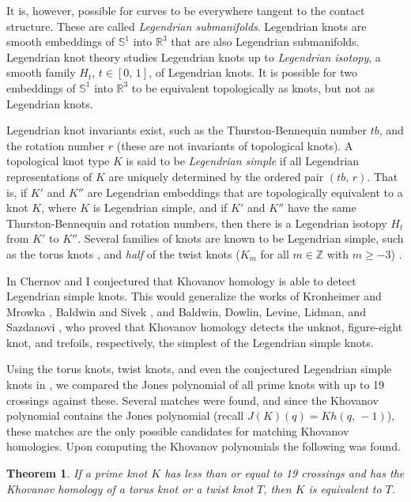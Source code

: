 \documentclass{article}
\theoremstyle{plain}
\newtheorem{theorem}{Theorem}
\begin{document}
        It is, however, possible for curves to be everywhere tangent to the
        contact structure. These are called \textit{Legendrian submanifolds}.
        Legendrian knots are smooth embeddings of $\mathbb{S}^{1}$ into
        $\mathbb{R}^{3}$ that are also Legendrian submanifolds. Legendrian
        knot theory studies Legendrian knots up to \textit{Legendrian isotopy},
        a smooth family $H_{t}$, $t\in[0,\,1]$, of Legendrian knots. It is
        possible for two embeddings of $\mathbb{S}^{1}$ into $\mathbb{R}^{3}$
        to be equivalent topologically as knots, but not as Legendrian knots.
        \par\hfill\par
        Legendrian knot invariants exist, such as the Thurston-Bennequin
        number $tb$, and the rotation number $r$ (these are not invariants of
        topological knots). A topological knot type $K$ is said to be
        \textit{Legendrian simple} if all Legendrian representations of $K$ are
        uniquely determined by the ordered pair $(tb,\,r)$. That is, if
        $K'$ and $K''$ are Legendrian embeddings that are topologically
        equivalent to a knot $K$, where $K$ is Legendrian simple, and if
        $K'$ and $K''$ have the same Thurston-Bennequin and rotation numbers,
        then there is a Legendrian isotopy $H_{t}$ from $K'$ to $K''$.
        Several families of knots are known to be Legendrian simple, such as
        the torus knots \cite{EtnyreHondaContactTopologyI}, and \textit{half}
        of the twist knots ($K_{m}$ for all $m\in\mathbb{Z}$ with $m\geq{-3}$)
        \cite{EtnyreEtAlLegendrianAndTransverseTwistKnots}.
        \par\hfill\par
        In \cite{ChernovMaguireLegendrianConjecture} Chernov and I conjectured
        that Khovanov homology is able to detect Legendrian simple knots. This
        would generalize the works of Kronheimer and Mrowka
        \cite{KronheimerMrowka2011KhovanovUnknot},
        Baldwin and Sivek \cite{BaldwinSivekKhovanovTrefoils}, and
        Baldwin, Dowlin, Levine, Lidman, and Sazdanovi
        \cite{BaldwinDowlinKhovanovFigureEight}, who proved that Khovanov
        homology detects the unknot, figure-eight knot, and trefoils,
        respectively, the simplest of the Legendrian simple knots.
        \par\hfill\par
        Using the torus knots, twist knots, and even the conjectured Legendrian
        simple knots in \cite{LegendrianKnotAtlas}, we compared the Jones
        polynomial of all prime knots with up to 19 crossings against these.
        Several matches were found, and since the Khovanov polynomial contains
        the Jones polynomial (recall $J(K)(q)=Kh(q,\,-1)$), these matches are
        the only possible candidates for matching Khovanov homologies. Upon
        computing the Khovanov polynomials the following was found.
        \begin{theorem}
            If a prime knot $K$ has less than or equal to 19 crossings and has
            the Khovanov homology of a torus knot or a twist knot $T$,
            then $K$ is equivalent to $T$.
        \end{theorem}
\end{document}
